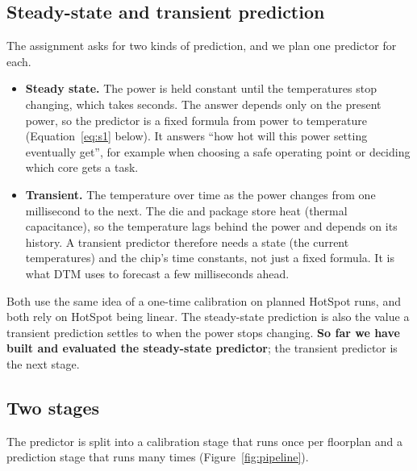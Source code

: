 \documentclass[11pt,a4paper]{article}
\begin{document}
\subsection{Steady-state and transient prediction}
The assignment asks for two kinds of prediction, and we plan one predictor for each.
\begin{itemize}
  \item \textbf{Steady state.} The power is held constant until the temperatures stop changing,
        which takes seconds. The answer depends only on the present power, so the predictor is
        a fixed formula from power to temperature (Equation~\eqref{eq:s1} below). It answers
        ``how hot will this power setting eventually get'', for example when choosing a safe
        operating point or deciding which core gets a task.
  \item \textbf{Transient.} The temperature over time as the power changes from one millisecond
        to the next. The die and package store heat (thermal capacitance), so the temperature
        lags behind the power and depends on its history. A transient predictor therefore needs
        a state (the current temperatures) and the chip's time constants, not just a fixed
        formula. It is what DTM uses to forecast a few milliseconds ahead.
\end{itemize}
Both use the same idea of a one-time calibration on planned HotSpot runs, and both rely on HotSpot
being linear. The steady-state prediction is also the value a transient prediction settles to
when the power stops changing. \textbf{So far we have built and evaluated the steady-state
predictor}; the transient predictor is the next stage.

\subsection{Two stages}
The predictor is split into a calibration stage that runs once per floorplan and a prediction
stage that runs many times (Figure~\ref{fig:pipeline}).
\end{document}

